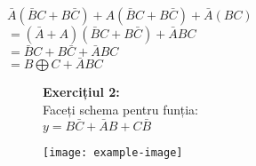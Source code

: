 \documentclass[12pt]{article}
\begin{document}
$\bar{A}(\bar{B}C+B\bar{C})+A(\bar{B}C+B\bar{C})+\bar{A}(BC)$\\
$=(\bar{A}+A)(\bar{B}C+B\bar{C})+\bar{A}BC$\\
$=\bar{B}C+B\bar{C}+\bar{A}BC$\\
$=B\bigoplus C +\bar{A}BC$\\

\begin{figure}[H]
    \begin{minipage}{0.4\textwidth}
        \textbf{Exercițiul 2:\\}
        Faceți schema pentru funția:\\
        $y=B\bar{C}+\bar{A}B+C\bar{B}$\\
    \end{minipage}
    \hfill
    \begin{minipage}{0.5\textwidth}
        \texttt{[image: example-image]}
    \end{minipage}
\end{figure}
\end{document}
